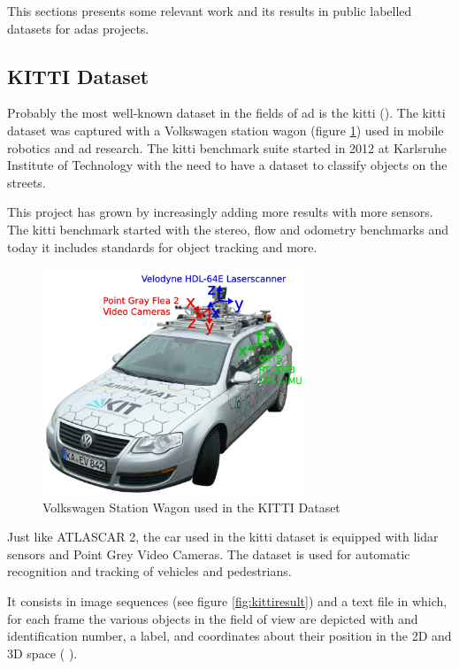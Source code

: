 This sections presents some relevant work and its results in public labelled datasets for \gls{adas} projects.

\subsection{KITTI Dataset}
Probably the most well-known dataset in the fields of \gls{ad} is the \gls{kitti} (\cite{KarlsruheInstituteofTechnology}). The \gls{kitti} dataset was captured with a Volkswagen station wagon (figure \ref{fig:kitticar}) used in mobile robotics and \gls{ad} research. The \gls{kitti} benchmark suite started in 2012 at Karlsruhe Institute of Technology with the need to have a dataset to classify objects on the streets. 

This project has grown by increasingly adding more results with more sensors. The \gls{kitti} benchmark started with the stereo, flow and odometry benchmarks and today it includes standards for object tracking and more. 

\begin{figure}[htp]
	
	\centering
	\includegraphics[width=0.7\textwidth]{capstate/imgs/kitticar}
	
	\caption{Volkswagen Station Wagon used in the KITTI Dataset}
	\label{fig:kitticar}
	
\end{figure}

Just like ATLASCAR 2, the car used in the \gls{kitti} dataset is equipped with \gls{lidar} sensors and Point Grey Video Cameras. The dataset is used for automatic recognition and tracking of vehicles and pedestrians. 

It consists in image sequences (see figure \ref{fig:kittiresult}) and a text file in which, for each frame the various objects in the field of view are depicted with and identification number, a label, and coordinates about their position in the 2D and 3D space ( \cite{Geiger}). 

